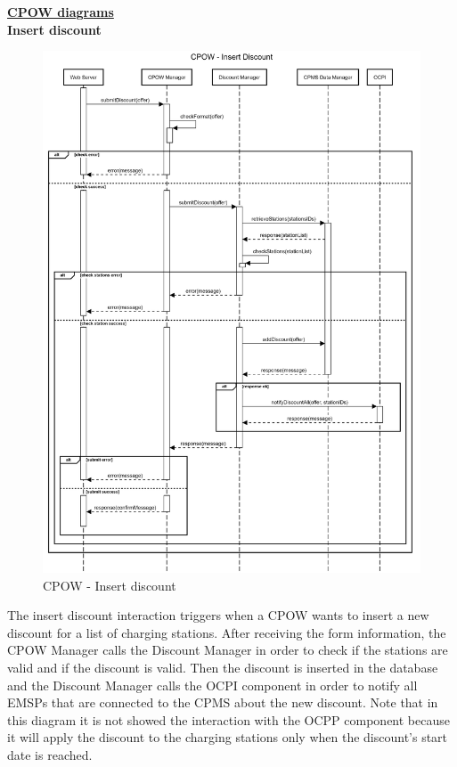 \documentclass[table, 12pt]{article}
\begin{document}
\underline{\textbf{CPOW diagrams}}\\
\textbf{Insert discount}
\begin{center}
    \begin{figure}[H]
        \includegraphics[scale=0.12, center]{assets/sequenceDiagrams/CPOW insert discount.png}
        \caption{CPOW - Insert discount}
        \label{CPOW - Insert discount}
    \end{figure}
\end{center}
The insert discount interaction triggers when a CPOW wants to insert a new discount for a list of charging stations.
After receiving the form information, the CPOW Manager calls the Discount Manager in order to check if the stations are valid and if the discount is valid.
Then the discount is inserted in the database and the Discount Manager calls the OCPI component in order to notify all EMSPs that are connected to the CPMS about the new discount.
Note that in this diagram it is not showed the interaction with the OCPP component because it will apply the discount to the charging stations only when the discount's start date is reached.
\newpage
\end{document}
